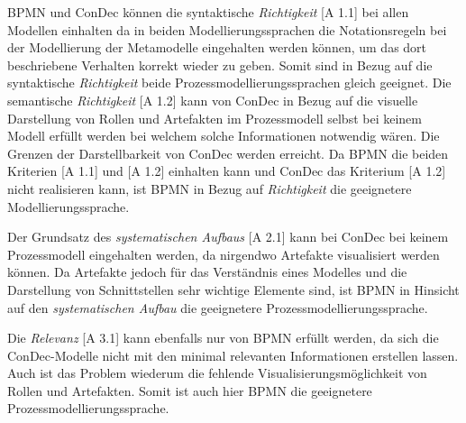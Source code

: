 {BPMN und ConDec können die syntaktische \textit{Richtigkeit} [A 1.1] bei allen Modellen einhalten da in beiden Modellierungssprachen die Notationsregeln bei der Modellierung der Metamodelle eingehalten werden können, um das dort beschriebene Verhalten korrekt wieder zu geben. Somit sind in Bezug auf die syntaktische \textit{Richtigkeit} beide Prozessmodellierungssprachen gleich geeignet.\newline
Die semantische \textit{Richtigkeit} [A 1.2] kann von ConDec in Bezug auf die visuelle Darstellung von Rollen und Artefakten im Prozessmodell selbst bei keinem Modell erfüllt werden bei welchem solche Informationen notwendig wären. Die Grenzen der Darstellbarkeit von ConDec  werden erreicht. \newline
Da BPMN die beiden Kriterien [A 1.1] und [A 1.2] einhalten kann und ConDec das Kriterium [A 1.2] nicht realisieren kann, ist BPMN in Bezug auf \textit{Richtigkeit} die geeignetere Modellierungssprache. \newline


Der  Grundsatz des \textit{systematischen Aufbaus} [A 2.1] kann bei ConDec bei keinem Prozessmodell eingehalten werden, da nirgendwo Artefakte visualisiert werden können. Da Artefakte jedoch für das Verständnis eines Modelles und die Darstellung von Schnittstellen sehr wichtige Elemente sind, ist BPMN in Hinsicht auf den \textit{systematischen Aufbau} die geeignetere Prozessmodellierungssprache. \newline


Die \textit{Relevanz} [A 3.1] kann ebenfalls nur von BPMN erfüllt werden, da sich die ConDec-Modelle nicht mit den minimal relevanten Informationen erstellen lassen. Auch ist das Problem wiederum die fehlende Visualisierungsmöglichkeit von Rollen und Artefakten. Somit ist auch hier BPMN die geeignetere Prozessmodellierungssprache.\newline

}
